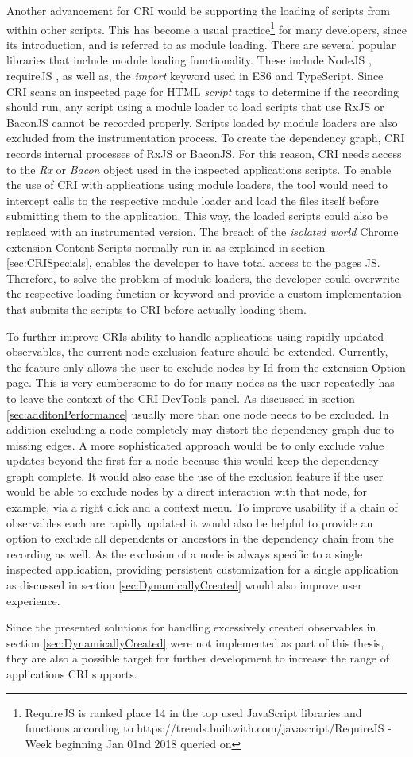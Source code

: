 Another advancement for CRI would be supporting the loading of scripts from within other scripts. This has become a usual practice\footnote{RequireJS is ranked place 14 in the top used JavaScript libraries and functions according to https://trends.builtwith.com/javascript/RequireJS - Week beginning Jan 01nd 2018 queried on \date{2018-01-03}} for many developers, since its introduction, and is referred to as module loading. There are several popular libraries that include module loading functionality. These include NodeJS \cite{NodeJS}, requireJS \cite{RequireJS}, as well as, the \emph{import} keyword used in ES6 and TypeScript. Since CRI scans an inspected page for HTML \emph{script} tags to determine if the recording should run, any script using a module loader to load scripts that use RxJS or BaconJS cannot be recorded properly. Scripts loaded by module loaders are also excluded from the instrumentation process. To create the dependency graph, CRI records internal processes of RxJS or BaconJS. For this reason, CRI needs access to the \emph{Rx} or \emph{Bacon} object used in the inspected applications scripts. To enable the use of CRI with applications using module loaders, the tool would need to intercept calls to the respective module loader and load the files itself before submitting them to the application. This way, the loaded scripts could also be replaced with an instrumented version. The breach of the \emph{isolated world} Chrome extension Content Scripts normally run in as explained in section \ref{sec:CRISpecials}, enables the developer to have total access to the pages JS. Therefore, to solve the problem of module loaders, the developer could overwrite the respective loading function or keyword and provide a custom implementation that submits the scripts to CRI before actually loading them.
	
To further improve CRIs ability to handle applications using rapidly updated observables, the current node exclusion feature should be extended. Currently, the feature only allows the user to exclude nodes by Id from the extension Option page. This is very cumbersome to do for many nodes as the user repeatedly has to leave the context of the CRI DevTools panel. As discussed in section \ref{sec:additonPerformance} usually more than one node needs to be excluded. In addition excluding a node completely may distort the dependency graph due to missing edges. A more sophisticated approach would be to only exclude value updates beyond the first for a node because this would keep the dependency graph complete. It would also ease the use of the exclusion feature if the user would be able to exclude nodes by a direct interaction with that node, for example, via a right click and a context menu. To improve usability if a chain of observables each are rapidly updated it would also be helpful to provide an option to exclude all dependents or ancestors in the dependency chain from the recording as well.
As the exclusion of a node is always specific to a single inspected application, providing persistent customization for a single application as discussed in section \ref{sec:DynamicallyCreated} would also improve user experience.

Since the presented solutions for handling excessively created observables in section \ref{sec:DynamicallyCreated} were not implemented as part of this thesis, they are also a possible target for further development to increase the range of applications CRI supports.
 	
